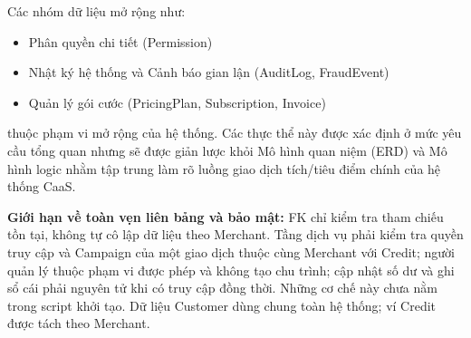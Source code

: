 Các nhóm dữ liệu mở rộng như:
\begin{itemize}
    \item Phân quyền chi tiết (Permission)
    \item Nhật ký hệ thống và Cảnh báo gian lận (AuditLog, FraudEvent)
    \item Quản lý gói cước (PricingPlan, Subscription, Invoice)
\end{itemize}
thuộc phạm vi mở rộng của hệ thống. Các thực thể này được xác định ở mức yêu cầu tổng quan nhưng sẽ được giản lược khỏi Mô hình quan niệm (ERD) và Mô hình logic nhằm tập trung làm rõ luồng giao dịch tích/tiêu điểm chính của hệ thống CaaS.

\textbf{Giới hạn về toàn vẹn liên bảng và bảo mật:} FK chỉ kiểm tra tham chiếu tồn tại, không tự cô lập dữ liệu theo Merchant. Tầng dịch vụ phải kiểm tra quyền truy cập và Campaign của một giao dịch thuộc cùng Merchant với Credit; người quản lý thuộc phạm vi được phép và không tạo chu trình; cập nhật số dư và ghi sổ cái phải nguyên tử khi có truy cập đồng thời. Những cơ chế này chưa nằm trong script khởi tạo. Dữ liệu Customer dùng chung toàn hệ thống; ví Credit được tách theo Merchant.
